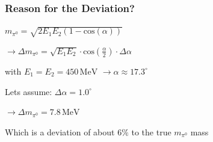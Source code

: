 \documentclass[slidestop,compress,mathserif]{beamer}
\begin{document}
\begin{frame}
	\frametitle{Reason for the Deviation?}
	\begin{center}
	
	$m_{\pi^0}=\sqrt{2 E_1E_2(1-\text{cos}(\alpha))}$
	
		$\rightarrow \Delta m_{\pi^0} =\sqrt{E_1 E_2} \cdot \text{cos}(\frac{\alpha}{2}) \cdot \Delta \alpha$
		\end{center} 
		
			\begin{center}
				
		with $E_1 = E_2 = 450\,\text{MeV}$ $\rightarrow \alpha \approx  17.3^{\circ}$
		
	\end{center}
			
	\begin{center}
					
		Lets assume: $\Delta \alpha = 1.0^{\circ}$
		
		$\rightarrow \Delta m_{\pi^0} = 7.8\,\text{MeV}$
		
		Which is a deviation of about $6\%$ to the true $m_{\pi^0}$ mass
		
	\end{center}

\end{frame}
\end{document}
